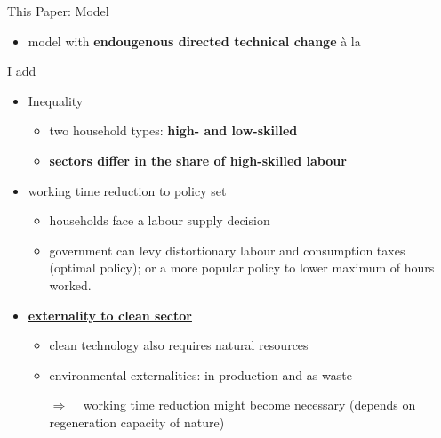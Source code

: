 \documentclass[11pt,aspectratio=169]{beamer}
\newcommand{\tr}[1]{\textcolor{blue}{#1}}
\newcommand{\ar}{$\Rightarrow$ \ }
\begin{document}
\begin{frame}{This Paper: Model}
	\begin{itemize}
\item model with \textbf{\alert{endougenous directed technical change}}  à la \cite{Acemoglu2012TheChange}
\end{itemize}
I add 
\begin{itemize}
\item Inequality
\begin{itemize}
\item two household types: \textbf{\alert{high- and low-skilled}}
\item \alert{\textbf{sectors differ in the share of high-skilled labour }}
\end{itemize}
\item working time reduction to policy set
\begin{itemize}
\item households face a labour supply decision
\item government can levy distortionary labour and consumption taxes (optimal policy); or a more popular policy to lower maximum of hours worked.
\end{itemize}

\item %
 \hyperlink{cleanSec}{\textbf{\alert{externality to clean sector}} }
\begin{itemize}
	\item clean technology also requires natural resources
	\item environmental externalities: in production and as waste
	\item[\ar] working time reduction might become necessary (depends on regeneration capacity of nature)
\end{itemize}
	\end{itemize}
\end{frame}
\end{document}
